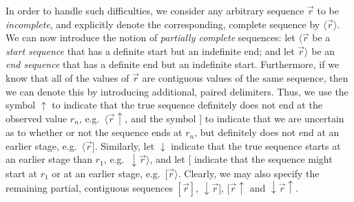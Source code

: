 \documentclass[a4paper]{article}
\newcommand{\up}{\!\uparrow}
\newcommand{\dn}{\downarrow\!}
\begin{document}
In order to handle such difficulties, we consider any arbitrary sequence $\vec{r}$ to be {\em incomplete},
and explicitly denote the corresponding, complete sequence by $\langle\vec{r}\rangle$.
We can now introduce the notion of {\em partially complete} sequences:
let  $\langle\vec{r}$ be a {\em start sequence} that has a definite start but an indefinite end;
and let $\vec{r}\rangle$ be an {\em end sequence} that has a definite end but an indefinite start.
Furthermore, if we know that all of the values of $\vec{r}$ are contiguous values of the same sequence,
then we can denote this by introducing additional, paired delimiters.
Thus, we use the symbol $\uparrow$ to indicate that the true sequence definitely does not end at the observed
value $r_n$, e.g.\ $\langle\vec{r}\up$, and the symbol $]$ to indicate that we are uncertain as to whether or not the
sequence ends at $r_n$, but definitely does not end at an earlier stage, e.g.\ $\langle\vec{r}]$.
Similarly, let $\downarrow$ indicate that the true sequence starts at an earlier stage than $r_1$, e.g.\ $\dn\vec{r}\rangle$,
and let $[$ indicate that the sequence might start at $r_1$ or at an earlier stage, e.g.\ $[\vec{r}\rangle$. Clearly, we may also
specify the remaining partial, contiguous sequences $[\vec{r}]$, $\dn\vec{r}]$, $[\vec{r}\up$ and $\dn\vec{r}\up$.
\end{document}
